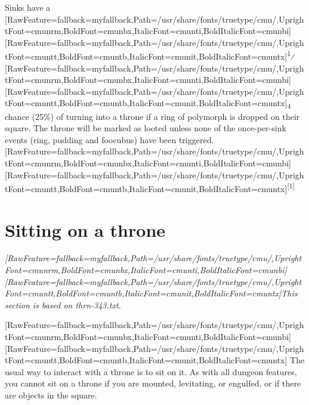 Sinks\footnotemark[37] have a \allowbreak{}\setmainfont{cmunrm.ttf}[RawFeature={fallback=myfallback},Path=/usr/share/fonts/truetype/cmu/,UprightFont=cmunrm,BoldFont=cmunbx,ItalicFont=cmunti,BoldItalicFont=cmunbi]\setmonofont{cmunrm.ttf}[RawFeature={fallback=myfallback},Path=/usr/share/fonts/truetype/cmu/,UprightFont=cmuntt,BoldFont=cmuntb,ItalicFont=cmunit,BoldItalicFont=cmuntx]\textsuperscript{1}⁄\allowbreak{}\setmainfont{cmunrm.ttf}[RawFeature={fallback=myfallback},Path=/usr/share/fonts/truetype/cmu/,UprightFont=cmunrm,BoldFont=cmunbx,ItalicFont=cmunti,BoldItalicFont=cmunbi]\setmonofont{cmunrm.ttf}[RawFeature={fallback=myfallback},Path=/usr/share/fonts/truetype/cmu/,UprightFont=cmuntt,BoldFont=cmuntb,ItalicFont=cmunit,BoldItalicFont=cmuntx]\textsubscript{4} chance (25\%) of turning into a throne if a ring of polymorph\footnotemark[38] is dropped on their square.  The throne will be marked as looted\footnotemark[39] unless none of the once-{}per-{}sink events (ring, pudding and foocubus) have been triggered.\allowbreak{}\setmainfont{cmunrm.ttf}[RawFeature={fallback=myfallback},Path=/usr/share/fonts/truetype/cmu/,UprightFont=cmunrm,BoldFont=cmunbx,ItalicFont=cmunti,BoldItalicFont=cmunbi]\setmonofont{cmunrm.ttf}[RawFeature={fallback=myfallback},Path=/usr/share/fonts/truetype/cmu/,UprightFont=cmuntt,BoldFont=cmuntb,ItalicFont=cmunit,BoldItalicFont=cmuntx]\textsuperscript{{$\text{[}$}1{$\text{]}$}}



\section{Sitting on a throne}
\label{2}

\begin{myquote}
\item{}{\itshape \allowbreak{}\setmainfont{cmunti.ttf}[RawFeature={fallback=myfallback},Path=/usr/share/fonts/truetype/cmu/,UprightFont=cmunrm,BoldFont=cmunbx,ItalicFont=cmunti,BoldItalicFont=cmunbi]\setmonofont{cmunti.ttf}[RawFeature={fallback=myfallback},Path=/usr/share/fonts/truetype/cmu/,UprightFont=cmuntt,BoldFont=cmuntb,ItalicFont=cmunit,BoldItalicFont=cmuntx]\itshape This section is based on thrn-{}343.txt\footnotemark[40].}
\end{myquote}
\allowbreak{}\setmainfont{cmunrm.ttf}[RawFeature={fallback=myfallback},Path=/usr/share/fonts/truetype/cmu/,UprightFont=cmunrm,BoldFont=cmunbx,ItalicFont=cmunti,BoldItalicFont=cmunbi]\setmonofont{cmunrm.ttf}[RawFeature={fallback=myfallback},Path=/usr/share/fonts/truetype/cmu/,UprightFont=cmuntt,BoldFont=cmuntb,ItalicFont=cmunit,BoldItalicFont=cmuntx]
The usual way to interact with a throne is to sit on it. As with all dungeon features, you cannot sit on a throne if you are mounted\footnotemark[41], levitating\footnotemark[42], or engulfed\footnotemark[43], or if there are objects in the square.


